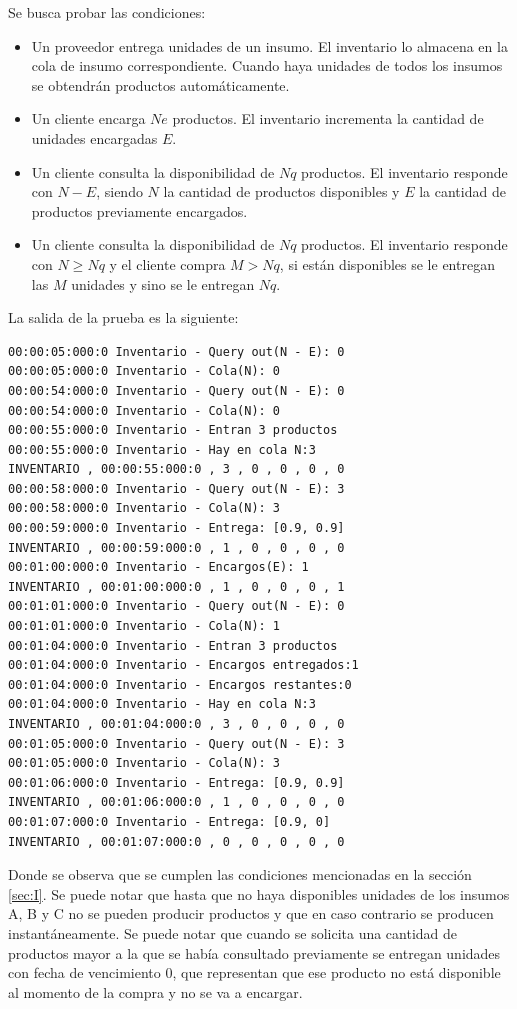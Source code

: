 \documentclass[10pt]{article}
\begin{document}
Se busca probar las condiciones:
\begin{itemize}
	\item Un proveedor entrega unidades de un insumo. El inventario lo almacena en la cola de insumo correspondiente. Cuando haya unidades de todos los insumos se obtendrán productos automáticamente.
	\item Un cliente encarga $Ne$ productos. El inventario incrementa la cantidad de unidades encargadas $E$.
	\item Un cliente consulta la disponibilidad de $Nq$ productos. El inventario responde con $N-E$, siendo $N$ la cantidad de productos disponibles y $E$ la cantidad de productos previamente encargados.
	\item Un cliente consulta la disponibilidad de $Nq$ productos. El inventario responde con $N \geq Nq$ y el cliente compra $M > Nq$, si están disponibles se le entregan las $M$ unidades y sino se le entregan $Nq$. 
\end{itemize}

La salida de la prueba es la siguiente:

\begin{minipage}{1\textwidth}
	\centering
	\begin{lstlisting}
00:00:05:000:0 Inventario - Query out(N - E): 0
00:00:05:000:0 Inventario - Cola(N): 0
00:00:54:000:0 Inventario - Query out(N - E): 0
00:00:54:000:0 Inventario - Cola(N): 0
00:00:55:000:0 Inventario - Entran 3 productos
00:00:55:000:0 Inventario - Hay en cola N:3
INVENTARIO , 00:00:55:000:0 , 3 , 0 , 0 , 0 , 0
00:00:58:000:0 Inventario - Query out(N - E): 3
00:00:58:000:0 Inventario - Cola(N): 3
00:00:59:000:0 Inventario - Entrega: [0.9, 0.9]
INVENTARIO , 00:00:59:000:0 , 1 , 0 , 0 , 0 , 0
00:01:00:000:0 Inventario - Encargos(E): 1
INVENTARIO , 00:01:00:000:0 , 1 , 0 , 0 , 0 , 1
00:01:01:000:0 Inventario - Query out(N - E): 0
00:01:01:000:0 Inventario - Cola(N): 1
00:01:04:000:0 Inventario - Entran 3 productos
00:01:04:000:0 Inventario - Encargos entregados:1
00:01:04:000:0 Inventario - Encargos restantes:0
00:01:04:000:0 Inventario - Hay en cola N:3
INVENTARIO , 00:01:04:000:0 , 3 , 0 , 0 , 0 , 0
00:01:05:000:0 Inventario - Query out(N - E): 3
00:01:05:000:0 Inventario - Cola(N): 3
00:01:06:000:0 Inventario - Entrega: [0.9, 0.9]
INVENTARIO , 00:01:06:000:0 , 1 , 0 , 0 , 0 , 0
00:01:07:000:0 Inventario - Entrega: [0.9, 0]
INVENTARIO , 00:01:07:000:0 , 0 , 0 , 0 , 0 , 0
	\end{lstlisting}
	
\end{minipage}
Donde se observa que se cumplen las condiciones mencionadas en la sección \ref{sec:I}. Se puede notar que hasta que no haya disponibles unidades de los insumos A, B y C no se pueden producir productos y que en caso contrario se producen instantáneamente.
Se puede notar que cuando se solicita una cantidad de productos mayor a la que se había consultado previamente se entregan unidades con fecha de vencimiento $0$, que representan que ese producto no está disponible al momento de la compra y no se va a encargar.
\end{document}
